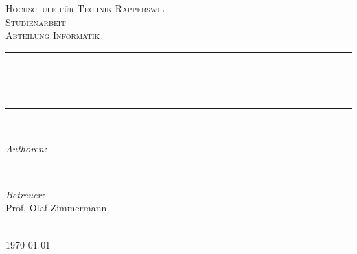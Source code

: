 \begin{titlepage}

\newcommand{\HRule}{\rule{\linewidth}{0.5mm}} %

\center %


\textsc{\LARGE Hochschule für Technik Rapperswil }\\[1.5cm] %
\textsc{\Large Studienarbeit}\\[0.5cm] %
\textsc{\large Abteilung Informatik}\\[0.5cm] %


\makeatletter
\HRule \\[0.4cm]
\begin{doublespacing}
{ \huge \textbf{\@title}}\\[0.2cm] %
\end{doublespacing}
\HRule \\[1.5cm]
 

\begin{minipage}{0.5\textwidth}
\begin{flushleft} \large
\emph{Authoren:}\\
\@author
\end{flushleft}
\end{minipage}
~
\begin{minipage}{0.4\textwidth}
\begin{flushright} \large
\emph{Betreuer:} \\
Prof. Olaf Zimmermann \\[1.2em] %
\end{flushright}
\end{minipage}\\[2cm]


{\large \today}\\[2cm] %

\vfill %

\end{titlepage}